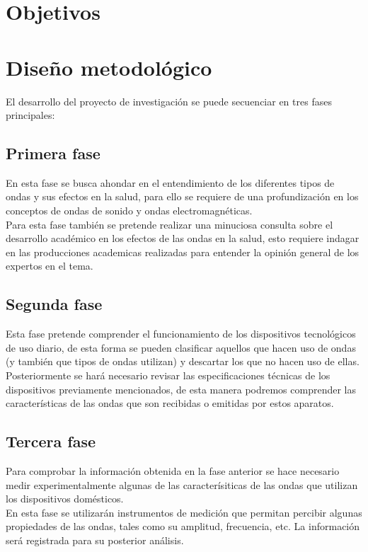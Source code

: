 \documentclass[spanish,notitlepage,letterpaper, 12pt]{article}
\begin{document}
\section{Objetivos}
\section{Diseño metodológico}
El desarrollo del proyecto de investigación se puede secuenciar en tres fases principales:
\subsection{Primera fase}
En esta fase se busca ahondar en el entendimiento de los diferentes tipos de ondas y sus efectos en la salud, para ello se requiere de una profundización en los conceptos de ondas de sonido y ondas electromagnéticas.\\

Para esta fase también se pretende realizar una minuciosa consulta sobre el desarrollo académico en los efectos de las ondas en la salud, esto requiere indagar en las producciones academicas realizadas para entender la opinión general de los expertos en el tema.

\subsection{Segunda fase}
Esta fase pretende comprender el funcionamiento de los dispositivos tecnológicos de uso diario, de esta forma se pueden clasificar aquellos que hacen uso de ondas (y también que tipos de ondas utilizan) y descartar los que no hacen uso de ellas.\\

Posteriormente se hará necesario revisar las especificaciones técnicas de los dispositivos previamente mencionados, de esta manera podremos comprender las características de las ondas que son recibidas o emitidas por estos aparatos.
\subsection{Tercera fase}
Para comprobar la información obtenida en la fase anterior se hace necesario medir experimentalmente algunas de las caracterísiticas de las ondas que utilizan los dispositivos domésticos.\\

En esta fase se utilizarán instrumentos de medición que permitan percibir algunas propiedades de las ondas, tales como su amplitud, frecuencia, etc. La información será registrada para su posterior análisis.
\end{document}
